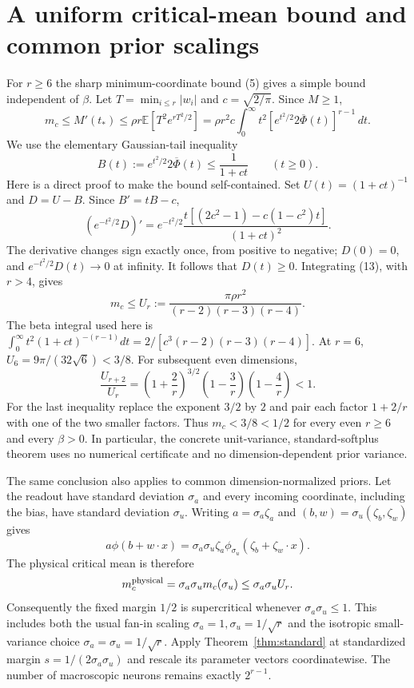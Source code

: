\documentclass[11pt]{article}
\newcommand{\E}{\mathbb E}\newcommand{\R}{\mathbb R}\newcommand{\Pp}{\mathbb P}
\begin{document}
\section{A uniform critical-mean bound and common prior scalings}
For $r\ge6$ the sharp minimum-coordinate bound (5) gives a simple
bound independent of $\beta$. Let $T=\min_{i\le r}|w_i|$ and
$c=\sqrt{2/\pi}$. Since $M\ge1$,
\[
 m_c\le M'(t_*)
 \le\rho r\E[T^2e^{rT^2/2}]
 =\rho r^2c\int_0^\infty t^2
       [e^{t^2/2}2\overline\Phi(t)]^{r-1}\,dt.
\]
We use the elementary Gaussian-tail inequality
\[
 B(t):=e^{t^2/2}2\overline\Phi(t)\le\frac1{1+ct}
                  \qquad(t\ge0).                          \tag{13}
\]
Here is a direct proof to make the bound self-contained. Set
$U(t)=(1+ct)^{-1}$ and $D=U-B$. Since $B'=tB-c$,
\[
 (e^{-t^2/2}D)'=
 e^{-t^2/2}\frac{t[(2c^2-1)-c(1-c^2)t]}{(1+ct)^2}.
\]
The derivative changes sign exactly once, from positive to negative;
$D(0)=0$, and $e^{-t^2/2}D(t)\to0$ at infinity. It follows that
$D(t)\ge0$. Integrating (13), with $r>4$, gives
\[
 m_c\le U_r:=\frac{\pi\rho r^2}{(r-2)(r-3)(r-4)}.           \tag{14}
\]
The beta integral used here is
$\int_0^\infty t^2(1+ct)^{-(r-1)}dt
=2/[c^3(r-2)(r-3)(r-4)]$.
At $r=6$, $U_6=9\pi/(32\sqrt6)<3/8$.
For subsequent even dimensions,
\[
 \frac{U_{r+2}}{U_r}
 =\left(1+\frac2r\right)^{3/2}
   \left(1-\frac3r\right)\left(1-\frac4r\right)<1.
\]
For the last inequality replace the exponent $3/2$ by $2$ and pair
each factor $1+2/r$ with one of the two smaller factors.
Thus $m_c<3/8<1/2$ for every even $r\ge6$ and every $\beta>0$.
In particular, the concrete unit-variance, standard-softplus theorem
uses no numerical certificate and no dimension-dependent prior variance.

The same conclusion also applies to common dimension-normalized
priors. Let the readout have standard deviation $\sigma_a$ and every
incoming coordinate, including the bias, have standard deviation
$\sigma_u$. Writing $a=\sigma_a\zeta_a$ and
$(b,w)=\sigma_u(\zeta_b,\zeta_w)$ gives
\[
 a\phi(b+w\cdot x)=\sigma_a\sigma_u\zeta_a
                       \phi_{\sigma_u}(\zeta_b+\zeta_w\cdot x).
\]
The physical critical mean is therefore
\[
 m_c^{\rm physical}=\sigma_a\sigma_u m_c(\sigma_u)
                   \le\sigma_a\sigma_u U_r.
\]
Consequently the fixed margin $1/2$ is supercritical whenever
$\sigma_a\sigma_u\le1$. This includes both the usual fan-in scaling
$\sigma_a=1,\sigma_u=1/\sqrt r$ and the isotropic small-variance
choice $\sigma_a=\sigma_u=1/\sqrt r$. Apply
Theorem~\ref{thm:standard} at standardized margin
$s=1/(2\sigma_a\sigma_u)$ and rescale its parameter vectors coordinatewise.
The number of macroscopic neurons remains exactly $2^{r-1}$.
\end{document}
